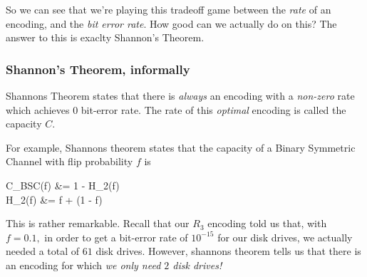 So we can see that we're playing this tradeoff game between the \textit{rate} of an 
encoding, and the \textit{bit error rate}. How good can we actually do on this?
The answer to this is exaclty Shannon's Theorem.

\subsubsection{Shannon's Theorem, informally}

Shannons Theorem states that there is \textit{always} an encoding with
a \textit{non-zero} rate which achieves 0 bit-error rate. The rate of this
\textit{optimal} encoding is called the capacity $C$.

For example, Shannons theorem states that the capacity of a Binary Symmetric
Channel with flip probability $f$ is
\begin{frml}
	C_{BSC(f)} &= 1 - H_2(f) \\
	H_2(f) &= f \log {} + (1 - f)\log {}
\end{frml}

This is rather remarkable. Recall that our $R_3$ encoding told us that, with
$f=0.1,$ in order
to get a bit-error rate of $10^{-15}$ for our disk drives, we actually needed
a total of $61$ disk drives. However, shannons theorem tells us that there is
an encoding for which \textit{we only need $2$ disk drives!}
